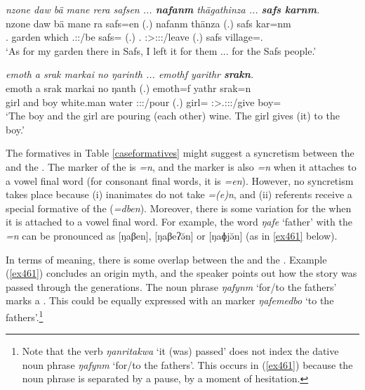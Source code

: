\begin{exe}
	\ex \emph{nzone daw bä mane rera safsen ... \textbf{nafanm} thägathinza ... \textbf{safs karnm}.}\\
	\gll nzone daw bä mane ra safs=en (.) nafanm thänza (.) safs kar=nm\\
	\Fsg.\Poss{} garden \Med{} which \Tsg.\F:\Pst:\Ipfv/be safs=\Loc{} (.) \Tnsg.\Poss{} \Sg:\Sbj>\Stpl:\Io:\Pst:\Ipfv/leave (.) safs village=\Dat.\Nsg{}\\
	\trans `As for my garden there in Safs, I left it for them ... for the Safs people.'
	\label{ex460}
\end{exe}
\begin{exe}
	\ex \emph{emoth a srak markai no ŋarinth ... emothf yarithr \textbf{srakn}.}\\
	\gll emoth a srak markai no ŋanth (.) emoth=f yathr srak=n\\
	girl and boy {white.man} water \Stdu:\Sbj:\Nonpast:\Ipfv/pour (.) girl=\Erg{} \Stsg:\Sbj>\Tsg.\Masc:\Io:\Nonpast:\Ipfv/give boy=\Dat\\ 
	\trans `The boy and the girl are pouring (each other) wine. The girl gives (it) to the boy.'
	\label{ex462}
\end{exe}
	
The formatives in Table \ref{caseformatives} might suggest a syncretism between the   and the  . The  marker of the  is \emph{=n}, and the  marker is also \emph{=n} when it attaches to a vowel final word (for consonant final words, it is \emph{=en}). However, no syncretism takes place because (i) inanimates do not take  \emph{=(e)n}, and (ii)  referents receive a special formative of the   (\emph{=dben}). Moreover, there is some variation for the  when it is attached to a vowel final word. For example, the word \emph{ŋafe} `father' with the  \emph{=n} can be pronounced as [ŋaβen], [ŋaβeʔə̆n] or [ŋaɸjə̆n] (as in \ref{ex461} below).%

In terms of meaning, there is some overlap between the  and the  . Example (\ref{ex461}) concludes an origin myth, and the speaker points out how the story was passed through the generations. The noun phrase \emph{ŋafynm} `for/to the fathers' marks a . This could be equally expressed with an   marker \emph{ŋafemedbo} `to the fathers'.\footnote{Note that the verb \emph{ŋanritakwa} `it (was) passed' does not index the dative noun phrase \emph{ŋafynm} `for/to the fathers'. This occurs in (\ref{ex461}) because the noun phrase is separated by a pause, by a moment of hesitation.}

